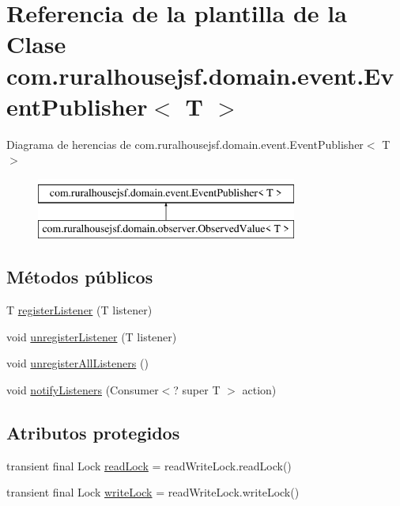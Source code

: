 \hypertarget{classcom_1_1ruralhousejsf_1_1domain_1_1event_1_1_event_publisher}{}\section{Referencia de la plantilla de la Clase com.\+ruralhousejsf.\+domain.\+event.\+Event\+Publisher$<$ T $>$}
\label{classcom_1_1ruralhousejsf_1_1domain_1_1event_1_1_event_publisher}
Diagrama de herencias de com.\+ruralhousejsf.\+domain.\+event.\+Event\+Publisher$<$ T $>$\begin{figure}[H]
\begin{center}
\leavevmode
\includegraphics[height=2.000000cm]{d8/d3f/classcom_1_1ruralhousejsf_1_1domain_1_1event_1_1_event_publisher}
\end{center}
\end{figure}
\subsection*{Métodos públicos}
\begin{DoxyCompactItemize}
\item 
T \mbox{\hyperlink{classcom_1_1ruralhousejsf_1_1domain_1_1event_1_1_event_publisher_a65329dd472a54e80c4f024ae2d30f5c2}{register\+Listener}} (T listener)
\item 
void \mbox{\hyperlink{classcom_1_1ruralhousejsf_1_1domain_1_1event_1_1_event_publisher_a148baf3f922934d82a7042f70959b516}{unregister\+Listener}} (T listener)
\item 
void \mbox{\hyperlink{classcom_1_1ruralhousejsf_1_1domain_1_1event_1_1_event_publisher_aba48051da7096e2451b0a4f2d92eef40}{unregister\+All\+Listeners}} ()
\item 
void \mbox{\hyperlink{classcom_1_1ruralhousejsf_1_1domain_1_1event_1_1_event_publisher_a7bd776be1bff02b358cfae8b22f33b73}{notify\+Listeners}} (Consumer$<$? super T $>$ action)
\end{DoxyCompactItemize}
\subsection*{Atributos protegidos}
\begin{DoxyCompactItemize}
\item 
transient final Lock \mbox{\hyperlink{classcom_1_1ruralhousejsf_1_1domain_1_1event_1_1_event_publisher_a5ffe504fad62f049d51a80fb912b97f5}{read\+Lock}} = read\+Write\+Lock.\+read\+Lock()
\item 
transient final Lock \mbox{\hyperlink{classcom_1_1ruralhousejsf_1_1domain_1_1event_1_1_event_publisher_a1ed2aa95b3bceee1d543a0d0d7297171}{write\+Lock}} = read\+Write\+Lock.\+write\+Lock()
\end{DoxyCompactItemize}
